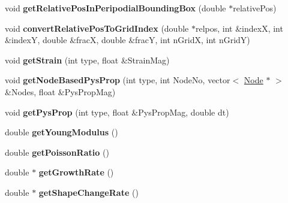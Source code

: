 \begin{DoxyCompactItemize}
\item 
\hypertarget{classShapeBase_a1c8199f314d271da360831d797f7c070}{}void {\bfseries get\+Relative\+Pos\+In\+Peripodial\+Bounding\+Box} (double $\ast$relative\+Pos)\label{classShapeBase_a1c8199f314d271da360831d797f7c070}

\item 
\hypertarget{classShapeBase_ad34b6e8535ad7a534110f03792f5f5d1}{}void {\bfseries convert\+Relative\+Pos\+To\+Grid\+Index} (double $\ast$relpos, int \&index\+X, int \&index\+Y, double \&frac\+X, double \&frac\+Y, int n\+Grid\+X, int n\+Grid\+Y)\label{classShapeBase_ad34b6e8535ad7a534110f03792f5f5d1}

\item 
\hypertarget{classShapeBase_aecf99016ea7c36e0bff43a40e6a89df3}{}void {\bfseries get\+Strain} (int type, float \&Strain\+Mag)\label{classShapeBase_aecf99016ea7c36e0bff43a40e6a89df3}

\item 
\hypertarget{classShapeBase_ac1368b84a5ed722fa7b9f82656b49969}{}void {\bfseries get\+Node\+Based\+Pys\+Prop} (int type, int Node\+No, vector$<$ \hyperlink{classNode}{Node} $\ast$ $>$ \&Nodes, float \&Pys\+Prop\+Mag)\label{classShapeBase_ac1368b84a5ed722fa7b9f82656b49969}

\item 
\hypertarget{classShapeBase_abff91451c3465778ed89624d6196f7f6}{}void {\bfseries get\+Pys\+Prop} (int type, float \&Pys\+Prop\+Mag, double dt)\label{classShapeBase_abff91451c3465778ed89624d6196f7f6}

\item 
\hypertarget{classShapeBase_ade96ff86461eaabce716e83fa68bfa19}{}double {\bfseries get\+Young\+Modulus} ()\label{classShapeBase_ade96ff86461eaabce716e83fa68bfa19}

\item 
\hypertarget{classShapeBase_a01140f17779cd2e990c9f28e3c86b77e}{}double {\bfseries get\+Poisson\+Ratio} ()\label{classShapeBase_a01140f17779cd2e990c9f28e3c86b77e}

\item 
\hypertarget{classShapeBase_a94b472ab0c5242226313cd096e17a3fe}{}double $\ast$ {\bfseries get\+Growth\+Rate} ()\label{classShapeBase_a94b472ab0c5242226313cd096e17a3fe}

\item 
\hypertarget{classShapeBase_a6f4d5556ac05b897919f49dacd0f8101}{}double $\ast$ {\bfseries get\+Shape\+Change\+Rate} ()\label{classShapeBase_a6f4d5556ac05b897919f49dacd0f8101}


\end{DoxyCompactItemize}
